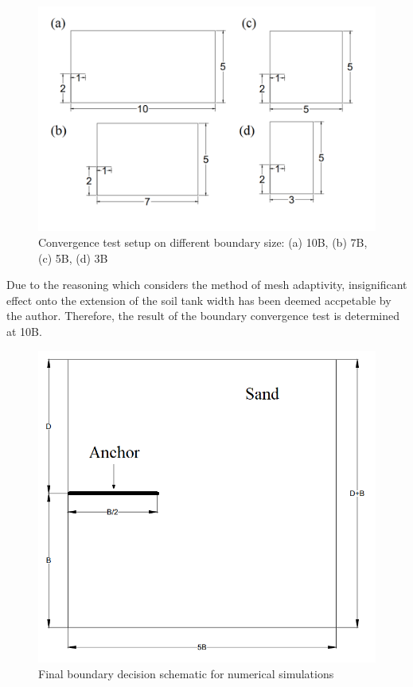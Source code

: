 \documentclass[a4paper, nobind]{templates/ociamthesis}
\begin{document}
\begin{figure}[H]
\includegraphics[width=1\linewidth]{myfigureeeeee/boundary} \caption{Convergence test setup on different boundary size: (a) 10B, (b) 7B, (c) 5B, (d) 3B}\label{fig:unnamed-chunk-19}
\end{figure}

Due to the reasoning which considers the method of mesh adaptivity, insignificant effect onto the extension of the soil tank width has been deemed accpetable by the author. Therefore, the result of the boundary convergence test is determined at 10B.

\begin{figure}[H]
\includegraphics[width=1\linewidth]{myfigureeeeee/boundary convergence2} \caption{Final boundary decision schematic for numerical simulations}\label{fig:unnamed-chunk-20}
\end{figure}
\end{document}
